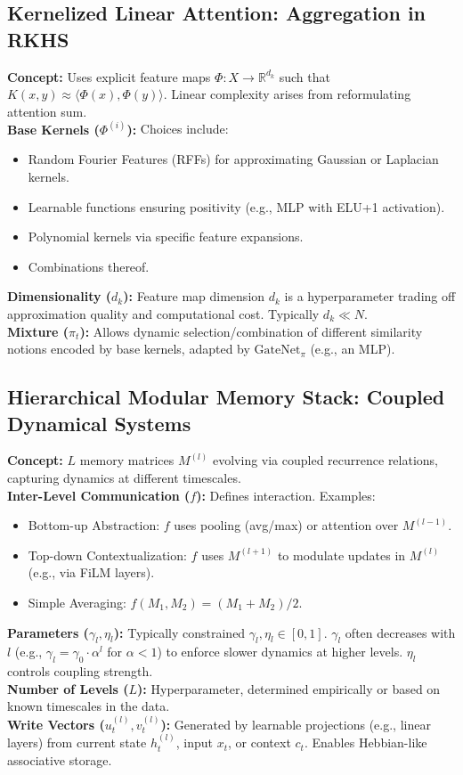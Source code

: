 \documentclass{article}
\begin{document}
\subsection{Kernelized Linear Attention: Aggregation in RKHS}
\textbf{Concept:} Uses explicit feature maps $\Phi: X \to \mathbb{R}^{d_k}$ such that $K(x, y) \approx \langle \Phi(x), \Phi(y) \rangle$. Linear complexity arises from reformulating attention sum. \\
\textbf{Base Kernels ($\Phi^{(i)}$):} Choices include:
\begin{itemize}
    \item Random Fourier Features (RFFs) for approximating Gaussian or Laplacian kernels.
    \item Learnable functions ensuring positivity (e.g., MLP with ELU+1 activation).
    \item Polynomial kernels via specific feature expansions.
    \item Combinations thereof.
\end{itemize}
\textbf{Dimensionality ($d_k$):} Feature map dimension $d_k$ is a hyperparameter trading off approximation quality and computational cost. Typically $d_k \ll N$. \\
\textbf{Mixture ($\pi_t$):} Allows dynamic selection/combination of different similarity notions encoded by base kernels, adapted by $\text{GateNet}_\pi$ (e.g., an MLP).

\subsection{Hierarchical Modular Memory Stack: Coupled Dynamical Systems}
\textbf{Concept:} $L$ memory matrices $M^{(l)}$ evolving via coupled recurrence relations, capturing dynamics at different timescales. \\
\textbf{Inter-Level Communication ($f$):} Defines interaction. Examples:
\begin{itemize}
    \item Bottom-up Abstraction: $f$ uses pooling (avg/max) or attention over $M^{(l-1)}$.
    \item Top-down Contextualization: $f$ uses $M^{(l+1)}$ to modulate updates in $M^{(l)}$ (e.g., via FiLM layers).
    \item Simple Averaging: $f(M_1, M_2) = (M_1 + M_2)/2$.
\end{itemize}
\textbf{Parameters ($\gamma_l, \eta_l$):} Typically constrained $\gamma_l, \eta_l \in [0, 1]$. $\gamma_l$ often decreases with $l$ (e.g., $\gamma_l = \gamma_0 \cdot \alpha^l$ for $\alpha < 1$) to enforce slower dynamics at higher levels. $\eta_l$ controls coupling strength. \\
\textbf{Number of Levels ($L$):} Hyperparameter, determined empirically or based on known timescales in the data. \\
\textbf{Write Vectors ($u_t^{(l)}, v_t^{(l)}$):} Generated by learnable projections (e.g., linear layers) from current state $h_t^{(l)}$, input $x_t$, or context $c_t$. Enables Hebbian-like associative storage.
\end{document}
